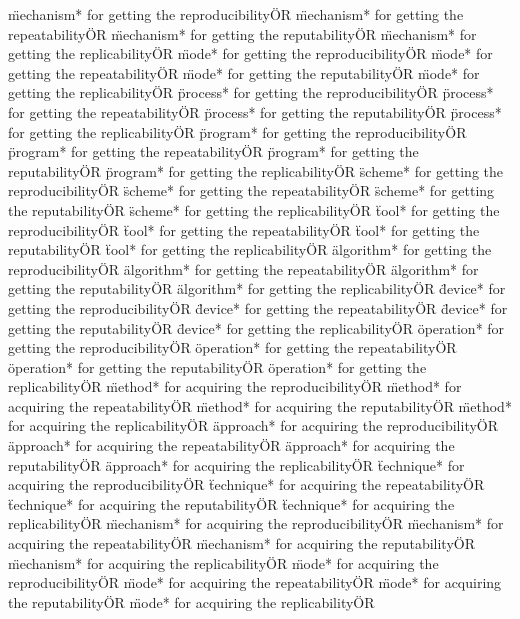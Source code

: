 \documentclass[
10pt, %
a4paper, %
oneside, %
headinclude,footinclude, %
BCOR5mm, %
]{scrartcl}
\begin{document}
\"mechanism* for getting the reproducibility\" OR \"mechanism* for getting the repeatability\" OR \"mechanism* for getting the reputability\" OR \"mechanism* for getting the replicability\" OR 
\"mode* for getting the reproducibility\" OR \"mode* for getting the repeatability\" OR \"mode* for getting the reputability\" OR \"mode* for getting the replicability\" OR 
\"process* for getting the reproducibility\" OR \"process* for getting the repeatability\" OR \"process* for getting the reputability\" OR \"process* for getting the replicability\" OR 
\"program* for getting the reproducibility\" OR \"program* for getting the repeatability\" OR \"program* for getting the reputability\" OR \"program* for getting the replicability\" OR 
\"scheme* for getting the reproducibility\" OR \"scheme* for getting the repeatability\" OR \"scheme* for getting the reputability\" OR \"scheme* for getting the replicability\" OR 
\"tool* for getting the reproducibility\" OR \"tool* for getting the repeatability\" OR \"tool* for getting the reputability\" OR \"tool* for getting the replicability\" OR 
\"algorithm* for getting the reproducibility\" OR \"algorithm* for getting the repeatability\" OR \"algorithm* for getting the reputability\" OR \"algorithm* for getting the replicability\" OR 
\"device* for getting the reproducibility\" OR \"device* for getting the repeatability\" OR \"device* for getting the reputability\" OR \"device* for getting the replicability\" OR 
\"operation* for getting the reproducibility\" OR \"operation* for getting the repeatability\" OR \"operation* for getting the reputability\" OR \"operation* for getting the replicability\" OR 
\"method* for acquiring the reproducibility\" OR \"method* for acquiring the repeatability\" OR \"method* for acquiring the reputability\" OR \"method* for acquiring the replicability\" OR 
\"approach* for acquiring the reproducibility\" OR \"approach* for acquiring the repeatability\" OR \"approach* for acquiring the reputability\" OR \"approach* for acquiring the replicability\" OR 
\"technique* for acquiring the reproducibility\" OR \"technique* for acquiring the repeatability\" OR \"technique* for acquiring the reputability\" OR \"technique* for acquiring the replicability\" OR 
\"mechanism* for acquiring the reproducibility\" OR \"mechanism* for acquiring the repeatability\" OR \"mechanism* for acquiring the reputability\" OR \"mechanism* for acquiring the replicability\" OR 
\"mode* for acquiring the reproducibility\" OR \"mode* for acquiring the repeatability\" OR \"mode* for acquiring the reputability\" OR \"mode* for acquiring the replicability\" OR 
\end{document}
